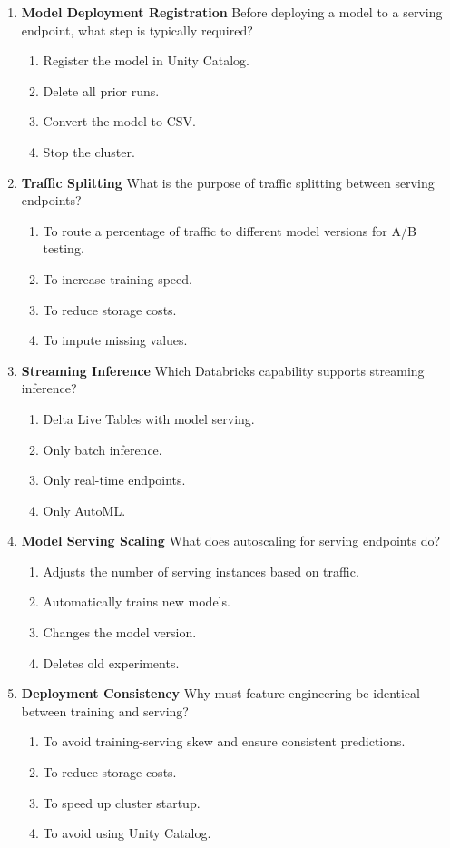 \documentclass{article}
\begin{document}
\begin{enumerate}[label=\textbf{Q\arabic*.}]
		\item \textbf{Model Deployment Registration}
		Before deploying a model to a serving endpoint, what step is typically required?
		\begin{enumerate}[label=\Alph*.]
			\item Register the model in Unity Catalog.
			\item Delete all prior runs.
			\item Convert the model to CSV.
			\item Stop the cluster.
		\end{enumerate}
		
		\item \textbf{Traffic Splitting}
		What is the purpose of traffic splitting between serving endpoints?
		\begin{enumerate}[label=\Alph*.]
			\item To route a percentage of traffic to different model versions for A/B testing.
			\item To increase training speed.
			\item To reduce storage costs.
			\item To impute missing values.
		\end{enumerate}
		
		\item \textbf{Streaming Inference}
		Which Databricks capability supports streaming inference?
		\begin{enumerate}[label=\Alph*.]
			\item Delta Live Tables with model serving.
			\item Only batch inference.
			\item Only real-time endpoints.
			\item Only AutoML.
		\end{enumerate}
		
		\item \textbf{Model Serving Scaling}
		What does autoscaling for serving endpoints do?
		\begin{enumerate}[label=\Alph*.]
			\item Adjusts the number of serving instances based on traffic.
			\item Automatically trains new models.
			\item Changes the model version.
			\item Deletes old experiments.
		\end{enumerate}
		
		\item \textbf{Deployment Consistency}
		Why must feature engineering be identical between training and serving?
		\begin{enumerate}[label=\Alph*.]
			\item To avoid training-serving skew and ensure consistent predictions.
			\item To reduce storage costs.
			\item To speed up cluster startup.
			\item To avoid using Unity Catalog.
		\end{enumerate}
		

\end{enumerate}
\end{document}
